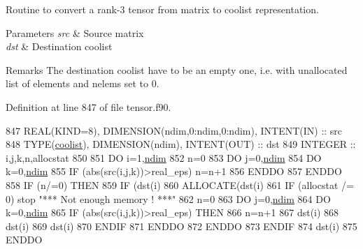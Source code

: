 Routine to convert a rank-\/3 tensor from matrix to coolist representation. 


\begin{DoxyParams}{Parameters}
{\em src} & Source matrix \\
\hline
{\em dst} & Destination coolist \\
\hline
\end{DoxyParams}
\begin{DoxyRemark}{Remarks}
The destination coolist have to be an empty one, i.\+e. with unallocated list of elements and nelems set to 0. 
\end{DoxyRemark}


Definition at line 847 of file tensor.\+f90.


\begin{DoxyCode}
847     \textcolor{keywordtype}{REAL(KIND=8)}, \textcolor{keywordtype}{DIMENSION(ndim,0:ndim,0:ndim)}, \textcolor{keywordtype}{INTENT(IN)} :: src
848     \textcolor{keywordtype}{TYPE}(\hyperlink{structtensor_1_1coolist}{coolist}), \textcolor{keywordtype}{DIMENSION(ndim)}, \textcolor{keywordtype}{INTENT(OUT)} :: dst
849     \textcolor{keywordtype}{INTEGER} :: i,j,k,n,allocstat
850     
851     \textcolor{keywordflow}{DO} i=1,\hyperlink{namespaceparams_a2323fe1773f086e20c14f266351c482b}{ndim}
852        n=0
853        \textcolor{keywordflow}{DO} j=0,\hyperlink{namespaceparams_a2323fe1773f086e20c14f266351c482b}{ndim}
854           \textcolor{keywordflow}{DO} k=0,\hyperlink{namespaceparams_a2323fe1773f086e20c14f266351c482b}{ndim}
855              \textcolor{keywordflow}{IF} (abs(src(i,j,k))>real\_eps) n=n+1
856 \textcolor{keywordflow}{          ENDDO}
857 \textcolor{keywordflow}{       ENDDO}
858        \textcolor{keywordflow}{IF} (n/=0) \textcolor{keywordflow}{THEN}
859           \textcolor{keywordflow}{IF} (dst(i)%
860           \textcolor{keyword}{ALLOCATE}(dst(i)%
861           \textcolor{keywordflow}{IF} (allocstat /= 0) stop \textcolor{stringliteral}{"*** Not enough memory ! ***"}
862           n=0
863           \textcolor{keywordflow}{DO} j=0,\hyperlink{namespaceparams_a2323fe1773f086e20c14f266351c482b}{ndim}
864              \textcolor{keywordflow}{DO} k=0,\hyperlink{namespaceparams_a2323fe1773f086e20c14f266351c482b}{ndim}
865                 \textcolor{keywordflow}{IF} (abs(src(i,j,k))>real\_eps) \textcolor{keywordflow}{THEN}
866                    n=n+1
867                    dst(i)%
868                    dst(i)%
869                    dst(i)%
870 \textcolor{keywordflow}{                ENDIF}
871 \textcolor{keywordflow}{             ENDDO}
872 \textcolor{keywordflow}{          ENDDO}
873 \textcolor{keywordflow}{       ENDIF}
874        dst(i)%
875 \textcolor{keywordflow}{    ENDDO}
\end{DoxyCode}
